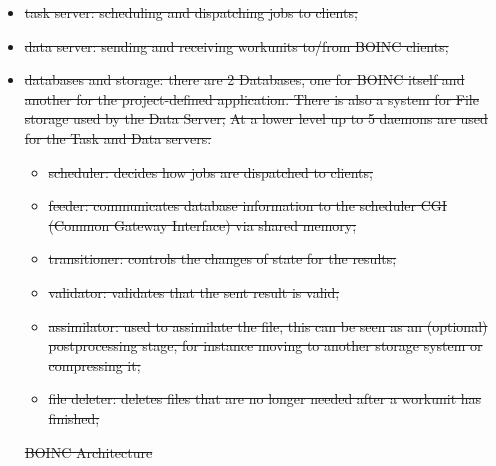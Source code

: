 \documentclass[journal abbreviation, manuscript]{copernicus}
\providecommand{\DIFdel}[1]{{\protect\color{red}\sout{#1}}}                      %
\providecommand{\DIFdelbegin}{} %
\providecommand{\DIFdelend}{} %
\providecommand{\DIFdelFL}[1]{\DIFdel{#1}} %
\begin{document}
\begin{itemize}
\DIFdelend \item \DIFdelbegin \DIFdel{task server: scheduling and dispatching jobs to clients;
 }%
\item%
\DIFdel{data server:  sending and receiving workunits to/from BOINC clients;
 }%
\item%
\DIFdel{databases and storage: there are 2 Databases, one for BOINC itself and another for the project-defined application. There is also a system for File storage used by the Data Server;
}%
\DIFdel{At a lower level up to 5 daemons are used for the Task and Data servers:
 }%
\begin{itemize}%
\item%
\DIFdel{scheduler: decides how jobs are dispatched to clients;
 }%
\item%
\DIFdel{feeder: communicates database information to the scheduler CGI (Common Gateway Interface) via shared memory;
 }%
\item%
\DIFdel{transitioner: controls the changes of state for the results;
 }%
\item%
\DIFdel{validator: validates that the sent result is valid;
 }%
\item%
\DIFdel{assimilator: used to assimilate the file, this can be seen as an (optional) postprocessing stage, for instance moving to another storage system or compressing it;
 }%
\item%
\DIFdel{file deleter: deletes files that are no longer needed after a workunit has finished;
 }
\end{itemize}%

{%
\DIFdelFL{BOINC Architecture}}


\end{itemize}
\end{document}
